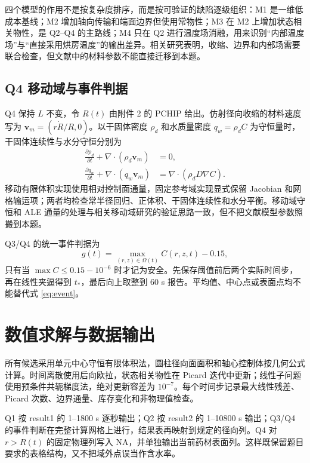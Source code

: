 \documentclass[withoutpreface,bwprint]{cumcmthesis}
\begin{document}
四个模型的作用不是按复杂度排序，而是按可验证的缺陷逐级组织：M1 是一维低成本基线；M2 增加轴向传输和端面边界但使用常物性；M3 在 M2 上增加状态相关物性，是 Q2--Q4 的主路线；M4 只在 Q2 进行温度场消融，用来识别“内部温度场”与“直接采用烘房温度”的输出差异。相关研究表明，收缩、边界和内部场需要联合检查，但文献中的材料参数不能直接迁移到本题\cite{p04,p05,p07}。

\subsection{Q4 移动域与事件判据}

Q4 保持 \(L\) 不变，令 \(R(t)\) 由附件 2 的 PCHIP 给出。仿射径向收缩的材料速度写为 \(\boldsymbol v_m=(r\dot R/R,0)\)。以干固体密度 \(\rho_d\) 和水质量密度 \(q_w=\rho_d C\) 为守恒量时，干固体连续性与水分守恒分别为
\begin{align}
\frac{\partial\rho_d}{\partial t}+\nabla\cdot(\rho_d\boldsymbol v_m)&=0,\\
\frac{\partial q_w}{\partial t}+\nabla\cdot(q_w\boldsymbol v_m)&=\nabla\cdot(\rho_dD\nabla C).
\end{align}
移动有限体积实现使用相对控制面通量，固定参考域实现显式保留 Jacobian 和网格输运项；两者均检查常半径回归、正体积、干固体连续性和水分平衡。移动域守恒和 ALE 通量的处理与相关移动域研究的验证思路一致，但不把文献模型参数照搬到本题\cite{p04,p09}。

Q3/Q4 的统一事件判据为
\begin{equation}
g(t)=\max_{(r,z)\in\Omega(t)}C(r,z,t)-0.15,
\label{eq:event}
\end{equation}
只有当 \(\max C\le0.15-10^{-6}\) 时才记为安全。先保存阈值前后两个实际时间步，再在线性夹逼得到 \(t_*\)，最后向上取整到 60 s 报告。平均值、中心点或表面点均不能替代式 \eqref{eq:event}。

\section{数值求解与数据输出}

所有候选采用单元中心守恒有限体积法，圆柱径向面面积和轴心控制体按几何公式计算。时间离散使用后向欧拉，状态相关物性在 Picard 迭代中更新；线性子问题使用预条件共轭梯度法，绝对更新容差为 \(10^{-7}\)。每个时间步记录最大线性残差、Picard 次数、边界通量、库存变化和非物理值检查。

Q1 按 result1 的 1--1800 s 逐秒输出；Q2 按 result2 的 1--10800 s 输出；Q3/Q4 的事件判断在完整计算网格上进行，结果表再映射到规定的径向列。Q4 对 \(r>R(t)\) 的固定物理列写入 NA，并单独输出当前药材表面列。这样既保留题目要求的表格结构，又不把域外点误当作含水率。
\end{document}
